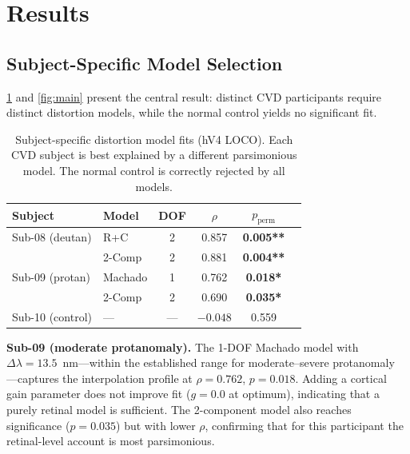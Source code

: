 \documentclass{article}
\begin{document}
\section{Results}
\label{sec:results}

\subsection{Subject-Specific Model Selection}

\cref{tab:main} and \cref{fig:main} present the central result: distinct CVD participants require distinct distortion models, while the normal control yields no significant fit.

\begin{table}[t]
  \caption{Subject-specific distortion model fits (hV4 LOCO). Each CVD subject is best explained by a different parsimonious model. The normal control is correctly rejected by all models.}
  \label{tab:main}
  \begin{center}
    \begin{small}
      \begin{tabular}{llcccc}
        \toprule
        Subject & Model & DOF & $\rho$ & $p_{\text{perm}}$ \\
        \midrule
        Sub-08 (deutan) & R+C & 2 & 0.857 & \textbf{0.005**} \\
         & 2-Comp & 2 & 0.881 & \textbf{0.004**} \\
        Sub-09 (protan) & Machado & 1 & 0.762 & \textbf{0.018*} \\
         & 2-Comp & 2 & 0.690 & \textbf{0.035*} \\
        Sub-10 (control) & --- & --- & $-0.048$ & 0.559 \\
        \bottomrule
      \end{tabular}
    \end{small}
  \end{center}
  \vskip -0.15in
\end{table}

\textbf{Sub-09 (moderate protanomaly).}
The 1-DOF Machado model with $\Delta\lambda = 13.5$~nm---within the established range for moderate--severe protanomaly \cite{placeholder_machado2009}---captures the interpolation profile at $\rho = 0.762$, $p = 0.018$.
Adding a cortical gain parameter does not improve fit ($g = 0.0$ at optimum), indicating that a purely retinal model is sufficient.
The 2-component model also reaches significance ($p = 0.035$) but with lower $\rho$, confirming that for this participant the retinal-level account is most parsimonious.
\end{document}
